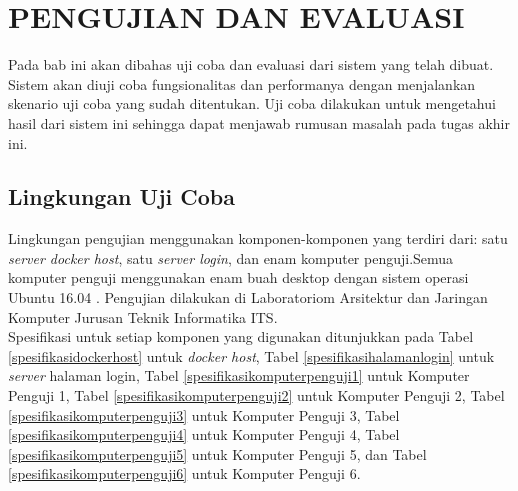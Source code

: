 \chapter{PENGUJIAN DAN EVALUASI}
Pada bab ini akan dibahas uji coba dan evaluasi dari sistem yang telah dibuat. Sistem akan diuji coba fungsionalitas dan performanya dengan menjalankan skenario uji coba yang sudah ditentukan. Uji coba dilakukan untuk mengetahui hasil dari sistem ini sehingga dapat menjawab rumusan masalah pada tugas akhir ini.    

\section{Lingkungan Uji Coba}
Lingkungan pengujian menggunakan komponen-komponen yang terdiri dari: satu \textit{server docker host}, satu \textit{server login}, dan enam komputer penguji.Semua komputer penguji menggunakan enam buah desktop dengan sistem operasi Ubuntu 16.04
. Pengujian dilakukan di Laboratoriom Arsitektur dan Jaringan Komputer Jurusan Teknik Informatika ITS. \\
\indent Spesifikasi untuk setiap komponen yang digunakan ditunjukkan pada Tabel \ref{spesifikasidockerhost} untuk \textit{docker host}, Tabel \ref{spesifikasihalamanlogin} untuk \textit{server} halaman login, Tabel \ref{spesifikasikomputerpenguji1} untuk Komputer Penguji 1, Tabel \ref{spesifikasikomputerpenguji2} untuk Komputer Penguji 2, Tabel \ref{spesifikasikomputerpenguji3} untuk Komputer Penguji 3, Tabel \ref{spesifikasikomputerpenguji4} untuk Komputer Penguji 4, Tabel \ref{spesifikasikomputerpenguji5} untuk Komputer Penguji 5, dan Tabel \ref{spesifikasikomputerpenguji6} untuk Komputer Penguji 6.
\newline
\newline
\newline
\newline
\newline
\newline
\newline
\newline
\newline
\newline
\newline

